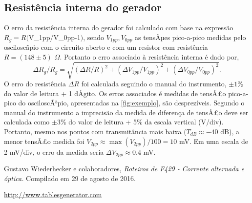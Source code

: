 \documentclass[11pt,a4paper]{article}
\begin{document}
\subsection{Resistência interna do gerador}
O erro da resistência interna do gerador foi calculado com base na expressão $R_g=R($V_{1pp}/V_{0pp}-1$)$, sendo $V_{1pp},V_{0pp}$ as tensÃµes pico-a-pico medidas pelo osciloscãpio com o circuito aberto e com um resistor com resistência $R=(148 \pm 5)$ $\Omega$. Portanto o erro associado à resistência interna é dado por,
\begin{equation}
\Delta R_g/R_g= \sqrt{ (\Delta R/R)^2+(\Delta V_{1pp}/V_{1pp})^2+(\Delta V_{0pp}/V_{0pp})^2 }.
\label{eq:erroRg}
\end{equation}
O erro do resistência $\Delta R$ foi calculada seguindo o manual do instrumento, $\pm 1$\% do valor de leitura + 1 dÃ­gito. Os erros associados é medidas de tensÃ£o pico-a-pico do osciloscÃ³pio, apresentadas na \cref{fig:exemplo}, são desprezíveis. Segundo o manual do instrumento a imprecisão da medida de diferença de tensÃ£o deve ser calculada como  $\pm3$\% do valor de leitura + 5\% da escala vertical (V/div).  Portanto, mesmo nos pontos com transmitância mais baixa ($T_{dB}\approx-40 $ dB), a menor tensÃ£o medida foi $V_{2pp}\approx \max(V_{2pp})/100 = 10$ mV. Em uma escala de 2 mV/div, o erro da medida seria $\Delta V_{2pp}\approx 0.4$ mV.


\begin{thebibliography}{10}

Gustavo Wiederhecker e colaboradores, \textsl{Roteiros de F429 - Corrente alternada e óptica.} Compilado em 29 de agosto de 2016.

\url{http://www.tablesgenerator.com}

\end{thebibliography}

\end{document}
